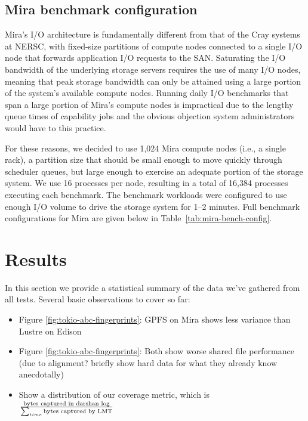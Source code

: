 \documentclass[conference,10pt,compsocconf]{IEEEtran}
\begin{document}
\subsection{Mira benchmark configuration}

Mira's I/O architecture is fundamentally different from that of the Cray
systems at NERSC, with fixed-size partitions of compute nodes connected to
a single I/O node that forwards application I/O requests to the SAN.
Saturating the I/O bandwidth of the underlying storage servers requires the
use of many I/O nodes, meaning that peak storage bandwidth can only be
attained using a large portion of the system's available compute nodes.
Running daily I/O benchmarks that span a large portion of Mira's compute
nodes is impractical due to the lengthy queue times of capability jobs and
the obvious objection system administrators would have to this practice.

For these reasons, we decided to use 1,024 Mira compute nodes (i.e., a single
rack), a partition size that should be small enough to move quickly through
scheduler queues, but large enough to exercise an adequate portion of the
storage system. We use 16 processes per node, resulting in a total of 16,384
processes executing each benchmark. The benchmark workloads were configured
to use enough I/O volume to drive the storage system for 1--2 minutes.
Full benchmark configurations for Mira are given below in
Table~\ref{tab:mira-bench-config}.

\section{Results} \label{results}

In this section we provide a statistical summary of the data we've gathered
from all tests.  Several basic observations to cover so far:

\begin{itemize}
\item Figure \ref{fig:tokio-abc-fingerprints}: GPFS on Mira shows less variance than Lustre on Edison
\item Figure \ref{fig:tokio-abc-fingerprints}: Both show worse shared file performance (due to alignment? briefly show hard data for what they already know anecdotally)
\item Show a distribution of our coverage metric, which is \( {\textup{bytes captured in darshan log}} \over {\sum_{time}^{ }{\textup{bytes captured by LMT}}} \)
\end{itemize}
\end{document}
